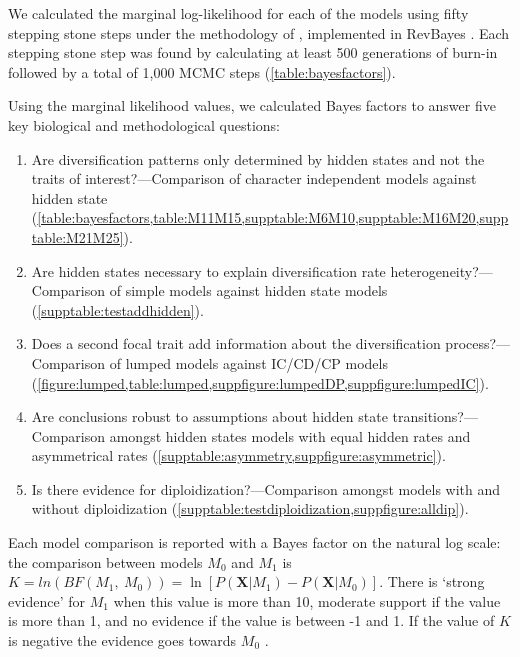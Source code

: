 We calculated the marginal log-likelihood for each of the models using fifty stepping stone steps under the methodology of \citet{xie_2010}, implemented in RevBayes \citep{hoehna_2016}.
Each stepping stone step was found by calculating at least 500 generations of burn-in followed by a total of 1,000 MCMC steps (\cref{table:bayesfactors}).

Using the marginal likelihood values, we calculated Bayes factors to answer five key biological and methodological questions:
\begin{enumerate}
\item Are diversification patterns only determined by hidden states and not the traits of interest?---Comparison of character independent models against hidden state (\cref{table:bayesfactors,table:M11M15,supptable:M6M10,supptable:M16M20,supptable:M21M25}).
\item Are hidden states necessary to explain diversification rate heterogeneity?---Comparison of simple models against hidden state models (\cref{supptable:testaddhidden}).
\item Does a second focal trait add information about the diversification process?---Comparison of lumped models against IC/CD/CP models (\cref{figure:lumped,table:lumped,suppfigure:lumpedDP,suppfigure:lumpedIC}).
\item Are conclusions robust to assumptions about hidden state transitions?---Comparison amongst hidden states models with equal hidden rates and asymmetrical rates (\cref{supptable:asymmetry,suppfigure:asymmetric}).
\item Is there evidence for diploidization?---Comparison amongst models with and without diploidization (\cref{supptable:testdiploidization,suppfigure:alldip}).
\end{enumerate}

Each model comparison is reported with a Bayes factor on the natural log scale: the comparison between models $M_0$ and $M_1$ is $K=ln(BF(M_1,\ M_0)) = \ln[ P(\mathbf{X} | M_1) - P(\mathbf{X} | M_0)]$.
There is `strong evidence' for $M_1$ when this value is more than 10, moderate support if the value is more than 1, and no evidence if the value is between -1 and 1.
If the value of $K$ is negative the evidence goes towards $M_0$ \citep{kass1995}.

